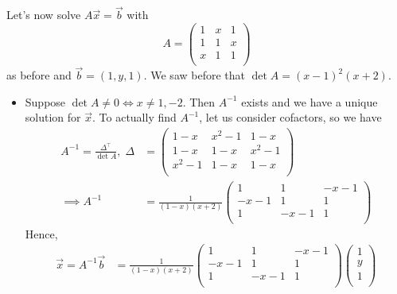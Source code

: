 \documentclass{../../template/note}
\begin{document}
    \begin{example}
        Let's now solve \(A \vec x = \vec b\) with
        \[
            A = \begin{pmatrix}
             1 & x & 1 \\
             1 & 1 & x \\
             x & 1 & 1 \\
            \end{pmatrix}
        \]
        as before and \(\vec b = (1, y, 1)\). We saw before that \(\det A = (x-1)^2(x+2)\).
        \begin{itemize}
            \item Suppose \(\det A \neq 0 \iff x \neq 1, -2\). Then \(A^{-1}\) exists and we have a unique solution for \(\vec x\). To actually find \(A^{-1}\), let us consider cofactors, so we have
            \begin{align*}
                A^{-1} = \frac{\Delta^\intercal}{\det A}, \; \Delta &= \begin{pmatrix}
                 1-x & x^2-1 & 1-x \\
                 1-x & 1-x & x^2-1 \\
                 x^2-1 & 1-x & 1-x \\
                \end{pmatrix} \\
                \implies A^{-1} &= \frac{1}{(1-x)(x+2)} \begin{pmatrix}
                 1 & 1 & -x-1 \\
                 -x-1 & 1 & 1 \\
                 1 & -x-1 & 1 \\
                \end{pmatrix}
            \end{align*}
            Hence,
            \begin{align*}
                \vec x = A^{-1} \vec b &= \frac{1}{(1-x)(x+2)} \begin{pmatrix}
                 1 & 1 & -x-1 \\
                 -x-1 & 1 & 1 \\
                 1 & -x-1 & 1 \\
                \end{pmatrix} \begin{pmatrix}
                 1 \\
                 y \\
                 1 \\

\end{pmatrix}
\end{align*}
\end{itemize}
\end{example}
\end{document}
